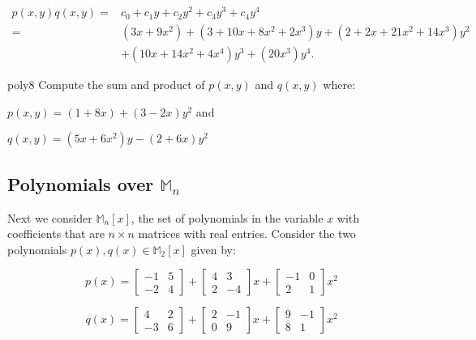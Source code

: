 \begin{align*}
p(x,y)q(x,y)=& c_0+c_1y+c_2y^2+c_3y^3+c_4y^4\\
=&(3x+9x^2)+(3+10x+8x^2+2x^3)y+(2+2x+21x^2+14x^3)y^2\\
&+(10x+14x^2+4x^4)y^3+(20x^3)y^4.
\end{align*}

\begin{exercise}{poly8}
Compute the sum and product of $p(x,y)$ and $q(x,y)$ where:

$p(x,y)=  (1+8x)+(3-2x)y^2$ and

$q(x,y)= (5x+6x^2)y-(2+6x)y^2$



\end{exercise}

\subsection*{Polynomials over $\mathbb{M}_n$}
Next we consider $\mathbb{M}_n[x]$, the set of polynomials in the variable $x$ with coefficients that are  $n{\times}n$ matrices with real entries. Consider the two polynomials $p(x), q(x) \in \mathbb{M}_2[x]$ given by:

$$p(x)=  \begin{bmatrix} 
-1 & 5  \\
-2 & 4 
\end{bmatrix}
+\begin{bmatrix} 
4 & 3 \\
2 & -4 
\end{bmatrix}
 x+\begin{bmatrix} 
-1 & 0 \\
2 & 1 
\end{bmatrix}
 x^2$$

$$q(x)=  \begin{bmatrix} 
4 & 2 \\
-3 & 6
\end{bmatrix}
+\begin{bmatrix} 
2 & -1 \\
0 & 9 
\end{bmatrix}
 x+\begin{bmatrix} 
9 & -1 \\
8 & 1 
\end{bmatrix}
 x^2$$

